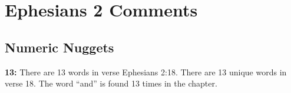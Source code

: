 \section{Ephesians 2 Comments}

\subsection{Numeric Nuggets}
\textbf{13:} There are 13 words in verse Ephesians 2:18. There are 13 unique words in verse 18. The word ``and'' is found 13 times in the chapter.